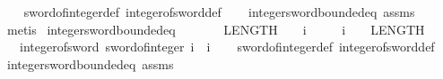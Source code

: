 \begin{isabellebody}
%
\isadelimproof
\ \ %
\endisadelimproof
%
\isatagproof
{}\isamarkupfalse%
\ sword{}{}{\isacharunderscore}{\kern0pt}of{\isacharunderscore}{\kern0pt}integer{\isacharunderscore}{\kern0pt}def\ integer{\isacharunderscore}{\kern0pt}of{\isacharunderscore}{\kern0pt}sword{}{}{\isacharunderscore}{\kern0pt}def\isanewline
\ \ \isamarkupfalse%
\ integer{\isacharunderscore}{\kern0pt}sword{\isacharunderscore}{\kern0pt}bounded{\isacharunderscore}{\kern0pt}eq\ assms\ \isanewline
\ \ \isamarkupfalse%
\ metis%
\endisatagproof
{\isafoldproof}%
%
\isadelimproof
\isanewline
%
\endisadelimproof
\isanewline
{}\isamarkupfalse%
\ integer{\isacharunderscore}{\kern0pt}sword{}{}{\isacharunderscore}{\kern0pt}bounded{\isacharunderscore}{\kern0pt}eq{\isacharcolon}{\kern0pt}\isanewline
\ \ \ \ {\isachardoublequoteopen}{\isacharminus}{\kern0pt}\ {\isacharparenleft}{\kern0pt}{}\ {\isacharcircum}{\kern0pt}\ {\isacharparenleft}{\kern0pt}LENGTH{\isacharparenleft}{\kern0pt}{}{}{\isacharparenright}{\kern0pt}\ {\isacharminus}{\kern0pt}\ {}{\isacharparenright}{\kern0pt}{\isacharparenright}{\kern0pt}\ {\isasymle}\ i{\isachardoublequoteclose}\isanewline
\ \ \ \ \ {\isachardoublequoteopen}i\ {\isacharless}{\kern0pt}\ {}\ {\isacharcircum}{\kern0pt}\ {\isacharparenleft}{\kern0pt}LENGTH{\isacharparenleft}{\kern0pt}{}{}{\isacharparenright}{\kern0pt}\ {\isacharminus}{\kern0pt}\ {}{\isacharparenright}{\kern0pt}{\isachardoublequoteclose}\isanewline
\ \ \ {\isachardoublequoteopen}integer{\isacharunderscore}{\kern0pt}of{\isacharunderscore}{\kern0pt}sword{}{}\ {\isacharparenleft}{\kern0pt}sword{}{}{\isacharunderscore}{\kern0pt}of{\isacharunderscore}{\kern0pt}integer\ i{\isacharparenright}{\kern0pt}\ {\isacharequal}{\kern0pt}\ i{\isachardoublequoteclose}\isanewline
%
\isadelimproof
\ \ %
\endisadelimproof
%
\isatagproof
{}\isamarkupfalse%
\ sword{}{}{\isacharunderscore}{\kern0pt}of{\isacharunderscore}{\kern0pt}integer{\isacharunderscore}{\kern0pt}def\ integer{\isacharunderscore}{\kern0pt}of{\isacharunderscore}{\kern0pt}sword{}{}{\isacharunderscore}{\kern0pt}def\isanewline
\ \ \isamarkupfalse%
\ integer{\isacharunderscore}{\kern0pt}sword{\isacharunderscore}{\kern0pt}bounded{\isacharunderscore}{\kern0pt}eq\ assms\isanewline

\end{isabellebody}
